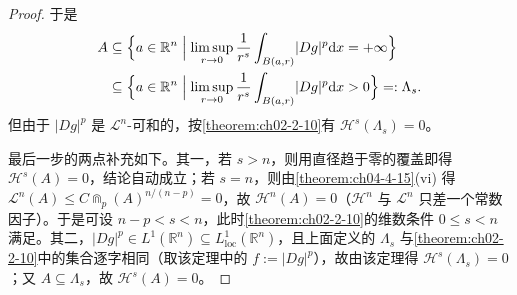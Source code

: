 \documentclass[../../main.tex]{subfiles}%
\begin{document}
\begin{proof}
于是
\begin{align*}
A&\subseteq\Bigl\{a\in\mathbb{R}^n\Bigm|\limsup_{r\to0}\frac{1}{r^s}\int_{B(a,r)}\lvert Dg\rvert^p\mathrm{d} x=+\infty\Bigr\}\\
&\subseteq\Bigl\{a\in\mathbb{R}^n\Bigm|\limsup_{r\to0}\frac{1}{r^s}\int_{B(a,r)}\lvert Dg\rvert^p\mathrm{d} x>0\Bigr\}=:\Lambda_s .
\end{align*}
但由于 $\lvert Dg\rvert^p$ 是 $\mathcal{L}^n$-可和的，按\cref{theorem:ch02-2-10}有 $\mathcal{H}^s(\Lambda_s)=0$。%

最后一步的两点补充如下。其一，若 $s>n$，则用直径趋于零的覆盖即得 $\mathcal{H}^s(A)=0$，结论自动成立；若 $s=n$，则由\cref{theorem:ch04-4-15}(vi) 得 $\mathcal{L}^n(A)\leqslant C\Cap_p(A)^{n/(n-p)}=0$，故 $\mathcal{H}^n(A)=0$（$\mathcal{H}^n$ 与 $\mathcal{L}^n$ 只差一个常数因子）。于是可设 $n-p<s<n$，此时\cref{theorem:ch02-2-10}的维数条件 $0\leqslant s<n$ 满足。其二，$\lvert Dg\rvert^p\in L^1(\mathbb{R}^n)\subseteq L^1_{\mathrm{loc}}(\mathbb{R}^n)$，且上面定义的 $\Lambda_s$ 与\cref{theorem:ch02-2-10}中的集合逐字相同（取该定理中的 $f:=\lvert Dg\rvert^p$），故由该定理得 $\mathcal{H}^s(\Lambda_s)=0$；又 $A\subseteq\Lambda_s$，故 $\mathcal{H}^s(A)=0$。%
\end{proof}
\end{document}
